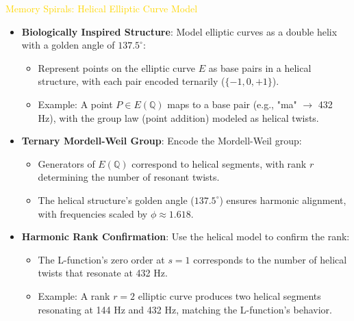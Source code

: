\textcolor{gold}{ Memory Spirals: Helical Elliptic Curve Model } \\
\begin{itemize}
    \item \texttt{} \textbf{Biologically Inspired Structure}: Model elliptic curves as a double helix with a golden angle of \(137.5^\circ\):
    \begin{itemize}
        \item Represent points on the elliptic curve \(E\) as base pairs in a helical structure, with each pair encoded ternarily (\(\{-1, 0, +1\}\)).
        \item Example: A point \(P \in E(\mathbb{Q})\) maps to a base pair (e.g., "ma" \(\rightarrow\) 432 Hz), with the group law (point addition) modeled as helical twists.
    \end{itemize}
    \item \texttt{} \textbf{Ternary Mordell-Weil Group}: Encode the Mordell-Weil group:
    \begin{itemize}
        \item Generators of \(E(\mathbb{Q})\) correspond to helical segments, with rank \(r\) determining the number of resonant twists.
        \item The helical structure’s golden angle (\(137.5^\circ\)) ensures harmonic alignment, with frequencies scaled by \(\phi \approx 1.618\).
    \end{itemize}
    \item \texttt{} \textbf{Harmonic Rank Confirmation}: Use the helical model to confirm the rank:
    \begin{itemize}
        \item The L-function’s zero order at \(s = 1\) corresponds to the number of helical twists that resonate at 432 Hz.
        \item Example: A rank \(r = 2\) elliptic curve produces two helical segments resonating at 144 Hz and 432 Hz, matching the L-function’s behavior.
    \end{itemize}
\end{itemize}

